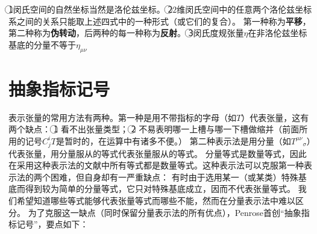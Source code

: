 \begin{note}
\textcircled{1}闵氏空间的自然坐标当然是洛伦兹坐标。
\textcircled{2}$2$维闵氏空间中的任意两个洛伦兹坐标系之间的关系只能取上述四式中的一种形式（或它们的复合）。
第一种称为\textbf{平移}，第二种称为\textbf{伪转动}，后两种的每一种称为\textbf{反射}。
\textcircled{3}闵氏度规张量$\eta$在非洛伦兹坐标基底的分量不等于$\eta_{\mu\nu}$
\end{note}

\section{抽象指标记号}
表示张量的常用方法有两种。第一种是用不带指标的字母（如$T$）代表张量，这有两个缺点：
\textcircled{1} 看不出张量类型；
\textcircled{2} 不易表明哪一上槽与哪一下槽做缩并（前面所用的记号$C^i_jT$是暂时的，在运算中有诸多不便。）
第二种表示法是用分量（如$T^{\mu\nu}{}_\sigma$）代表张量，用分量服从的等式代表张量服从的等式。
分量等式是数量等式，因此在采用这种表示法的文献中所有等式都是数量等式。这种表示法可以克服第一种表示法的两个困难，但自身却有一严重缺点：
有时由于选用某一（或某类）特殊基底而得到较为简单的分量等式，它只对特殊基底成立，因而不代表张量等式。
我们希望知道哪些等式能够代表张量等式而哪些不能，然而在分量表示法中难以区分。
为了克服这一缺点（同时保留分量表示法的所有优点），Penrose首创``抽象指标记号''，要点如下：
